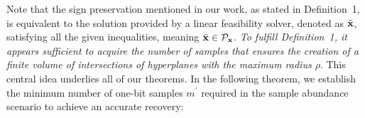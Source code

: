 \documentclass[12pt,draftcls,onecolumn]{IEEEtran}
\newcommand{\Fr}[1]{\textcolor{blue}{#1}}
\begin{document}
Note that the sign preservation mentioned in our work, as stated in Definition~1, is equivalent to the solution provided by a linear feasibility solver, denoted as $\bar{\mathbf{x}}$, satisfying all the given inequalities, meaning $\bar{\mathbf{x}}\in\mathcal{P}_{\mathbf{x}}$. \emph{To fulfill Definition~1, it appears sufficient to acquire the number of samples that ensures the creation of a finite volume of intersections of hyperplanes with the maximum radius $\rho$}. This central idea underlies all of our theorems.
In the following theorem, we establish the minimum number of one-bit samples $m^{\prime}$ required in the sample abundance scenario to achieve an accurate recovery:

\end{document}
